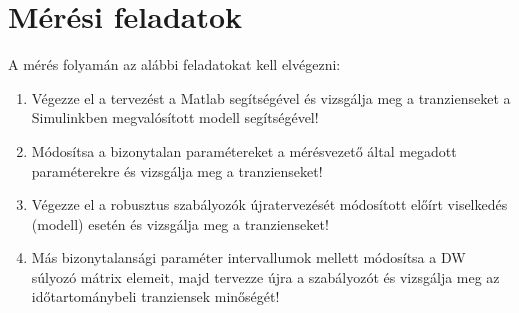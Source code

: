 \chapter{Mérési feladatok}\label{sect:LatexTools}
%

A mérés folyamán az alábbi feladatokat kell elvégezni:
\begin{enumerate}
	\item Végezze el a tervezést a Matlab segítségével és vizsgálja meg a tranzienseket a Simulinkben megvalósított
	modell segítségével!
	\item Módosítsa a bizonytalan paramétereket a mérésvezető által megadott paraméterekre és vizsgálja meg
	a tranzienseket!
	\item Végezze el a robusztus szabályozók újratervezését módosított előírt viselkedés (modell) esetén és
	vizsgálja meg a tranzienseket!
	\item Más bizonytalansági paraméter intervallumok mellett módosítsa a DW súlyozó mátrix elemeit, majd
	tervezze újra a szabályozót és vizsgálja meg az időtartománybeli tranziensek minőségét!
\end{enumerate}
